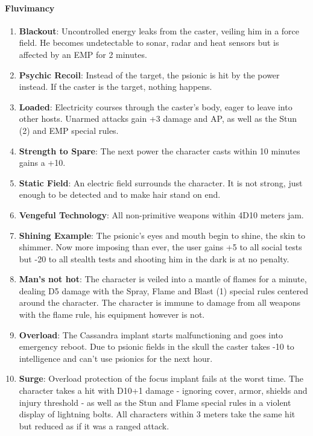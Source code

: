 \documentclass[12pt,a4paper,openany]{book}
\newcommand{\mod}[2]{\item \textbf{#1}: #2}
\newcommand{\dpeii}{\mod{Psychic Recoil}{Instead of the target, the psionic is hit by the power instead. If the caster is the target, nothing happens.}}
\newcommand{\dpeiv}{\mod{Strength to Spare}{The next power the character casts within 10 minutes gains a +10.}}
\newcommand{\dpeix}{\mod{Overload}{The Cassandra implant starts malfunctioning and goes into emergency reboot. Due to psionic fields in the skull the caster takes -10 to intelligence and can't use psionics for the next hour.}\setcounter{enumi}{-1}}
\begin{document}
	\paragraph{Fluvimancy}
	\begin{enumerate}
		\mod{Blackout}{Uncontrolled energy leaks from the caster, veiling him in a force field. He becomes undetectable to sonar, radar and heat sensors but is affected by an EMP for 2 minutes.}
		\dpeii
		\mod{Loaded}{Electricity courses through the caster's body, eager to leave into other hosts. Unarmed attacks gain +3 damage and AP, as well as the Stun (2) and EMP special rules.}
		\dpeiv
		\mod{Static Field}{An electric field surrounds the character. It is not strong, just enough to be detected and to make hair stand on end.}
		\mod{Vengeful Technology}{All non-primitive weapons within 4D10 meters jam.}
		\mod{Shining Example}{The psionic's eyes and mouth begin to shine, the skin to shimmer. Now more imposing than ever, the user gains +5 to all social tests but -20 to all stealth tests and shooting him in the dark is at no penalty.}
		\mod{Man's not hot}{The character is veiled into a mantle of flames for a minute, dealing D5 damage with the Spray, Flame and Blast (1) special rules centered around the character. The character is immune to damage from all weapons with the flame rule, his equipment however is not.}
		\dpeix
		\mod{Surge}{Overload protection of the focus implant fails at the worst time. The character takes a hit with D10+1 damage - ignoring cover, armor, shields and injury threshold - as well as the Stun and Flame special rules in a violent display of lightning bolts. All characters within 3 meters take the same hit but reduced as if it was a ranged attack.}
	\end{enumerate}
\end{document}
